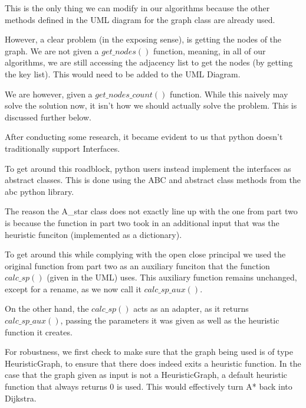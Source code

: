 \documentclass{article}
\begin{document}
This is the only thing we can modify in our algorithms because the other methods defined in the UML diagram for the graph class are already used.

However, a clear problem (in the exposing sense), is getting the nodes of the graph. We are not given a $get\_nodes()$ function, meaning, in all of our algorithms, we are still accessing the adjacency list to get the nodes (by getting the key list). This would need to be added to the UML Diagram.

We are however, given a $get\_nodes\_count()$ function. While this naively may solve the solution now, it isn't how we should actually solve the problem. This is discussed further below.


After conducting some research, it became evident to us that python doesn't traditionally support Interfaces. 

To get around this roadblock, python users instead implement the interfaces as abstract classes.
This is done using the ABC and abstract class methods from the abc python library. 

The reason the A\_star class does not exactly line up with the one from part two is because the function in part two took in an additional input that was the heuristic funciton (implemented as a dictionary). 

To get around this while complying with the open close principal we used the original function from part two as an auxiliary funciton that the function $calc\_sp()$ (given in the UML) uses. This auxiliary function remains unchanged, except for a rename, as we now call it $calc\_sp\_aux()$. 

On the other hand, the $calc\_sp()$ acts as an adapter, as it returns $calc\_sp\_aux()$, passing the parameters it was given as well as the heuristic function it creates.

For robustness, we first check to make sure that the graph being used is of type HeuristicGraph, to ensure that there does indeed exits a heuristic function. 
In the case that the graph given as input is not a HeuristicGraph, a default heuristic function that always returns 0 is used. This would effectively turn A* back into Dijkstra. 
\end{document}
